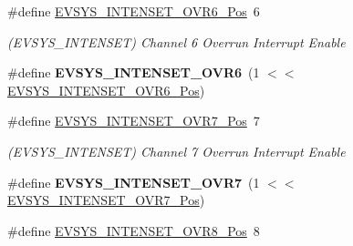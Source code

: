 \begin{DoxyCompactItemize}
\item 
\hypertarget{group___s_a_m_l21___e_v_s_y_s_ga66e3a907b86b2064be2500c8c4aa930c}{}\#define \hyperlink{group___s_a_m_l21___e_v_s_y_s_ga66e3a907b86b2064be2500c8c4aa930c}{E\+V\+S\+Y\+S\+\_\+\+I\+N\+T\+E\+N\+S\+E\+T\+\_\+\+O\+V\+R6\+\_\+\+Pos}~6\label{group___s_a_m_l21___e_v_s_y_s_ga66e3a907b86b2064be2500c8c4aa930c}

\begin{DoxyCompactList}\small\item\em (E\+V\+S\+Y\+S\+\_\+\+I\+N\+T\+E\+N\+S\+E\+T) Channel 6 Overrun Interrupt Enable \end{DoxyCompactList}\item 
\hypertarget{group___s_a_m_l21___e_v_s_y_s_ga35fb3da4f43283d71d300af74915f743}{}\#define {\bfseries E\+V\+S\+Y\+S\+\_\+\+I\+N\+T\+E\+N\+S\+E\+T\+\_\+\+O\+V\+R6}~(1 $<$$<$ \hyperlink{group___s_a_m_l21___e_v_s_y_s_ga66e3a907b86b2064be2500c8c4aa930c}{E\+V\+S\+Y\+S\+\_\+\+I\+N\+T\+E\+N\+S\+E\+T\+\_\+\+O\+V\+R6\+\_\+\+Pos})\label{group___s_a_m_l21___e_v_s_y_s_ga35fb3da4f43283d71d300af74915f743}

\item 
\hypertarget{group___s_a_m_l21___e_v_s_y_s_ga38cd3956f4c2d97e253fc2c9a642af0c}{}\#define \hyperlink{group___s_a_m_l21___e_v_s_y_s_ga38cd3956f4c2d97e253fc2c9a642af0c}{E\+V\+S\+Y\+S\+\_\+\+I\+N\+T\+E\+N\+S\+E\+T\+\_\+\+O\+V\+R7\+\_\+\+Pos}~7\label{group___s_a_m_l21___e_v_s_y_s_ga38cd3956f4c2d97e253fc2c9a642af0c}

\begin{DoxyCompactList}\small\item\em (E\+V\+S\+Y\+S\+\_\+\+I\+N\+T\+E\+N\+S\+E\+T) Channel 7 Overrun Interrupt Enable \end{DoxyCompactList}\item 
\hypertarget{group___s_a_m_l21___e_v_s_y_s_ga673a878b469b02ad1e42b1319da85847}{}\#define {\bfseries E\+V\+S\+Y\+S\+\_\+\+I\+N\+T\+E\+N\+S\+E\+T\+\_\+\+O\+V\+R7}~(1 $<$$<$ \hyperlink{group___s_a_m_l21___e_v_s_y_s_ga38cd3956f4c2d97e253fc2c9a642af0c}{E\+V\+S\+Y\+S\+\_\+\+I\+N\+T\+E\+N\+S\+E\+T\+\_\+\+O\+V\+R7\+\_\+\+Pos})\label{group___s_a_m_l21___e_v_s_y_s_ga673a878b469b02ad1e42b1319da85847}

\item 
\hypertarget{group___s_a_m_l21___e_v_s_y_s_ga3c10a5ddd0e57bb5a58184d869a4f134}{}\#define \hyperlink{group___s_a_m_l21___e_v_s_y_s_ga3c10a5ddd0e57bb5a58184d869a4f134}{E\+V\+S\+Y\+S\+\_\+\+I\+N\+T\+E\+N\+S\+E\+T\+\_\+\+O\+V\+R8\+\_\+\+Pos}~8\label{group___s_a_m_l21___e_v_s_y_s_ga3c10a5ddd0e57bb5a58184d869a4f134}


\end{DoxyCompactItemize}
